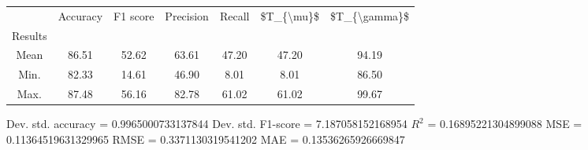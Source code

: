 \begin{tabular}{|c|c|c|c|c|c|c|}
\toprule
{} &  Accuracy &  F1 score &  Precision &  Recall &  \$T\_\{\textbackslash mu\}\$ &  \$T\_\{\textbackslash gamma\}\$ \\
Results &           &           &            &         &            &               \\
\hline
Mean    &     86.51 &     52.62 &      63.61 &   47.20 &      47.20 &         94.19 \\
Min.    &     82.33 &     14.61 &      46.90 &    8.01 &       8.01 &         86.50 \\
Max.    &     87.48 &     56.16 &      82.78 &   61.02 &      61.02 &         99.67 \\
\bottomrule
\end{tabular}

 Dev. std. accuracy = 0.9965000733137844
 Dev. std. F1-score = 7.187058152168954
 $R^2$ = 0.16895221304899088
 MSE = 0.11364519631329965
 RMSE = 0.3371130319541202
 MAE = 0.13536265926669847